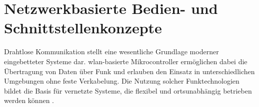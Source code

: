 \section{Netzwerkbasierte Bedien- und Schnittstellenkonzepte}
Drahtlose Kommunikation stellt eine wesentliche Grundlage moderner eingebetteter Systeme dar. 
\gls{wlan}-basierte Mikrocontroller ermöglichen dabei die Übertragung von Daten über Funk und erlauben den Einsatz in unterschiedlichen Umgebungen ohne feste Verkabelung. 
Die Nutzung solcher Funktechnologien bildet die Basis für vernetzte Systeme, die flexibel und ortsunabhängig betrieben werden können \cite{hernandez2022wifi}.